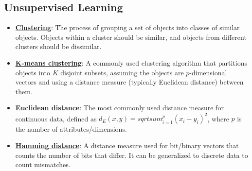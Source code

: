 \documentclass{article}%
\begin{document}
%
\subsection{Unsupervised Learning}%
\label{subsec:UnsupervisedLearning}%
\begin{itemize}[leftmargin=*]%
\item \href{https://purdue.brightspace.com/d2l/common/assets/pdfjs-d2l-dist/1.0.14-legacy/web/viewer.html?file=\%2Fcontent\%2Fenforced\%2F1095467-wl.202510.CS.24300.001\%2F12L2-distance-clusters.pdf\%3Fou\%3D1095467\&lang=en-us\&container=d2l-fileviewer-rendered-pdf\&fullscreen=d2l-fileviewer-rendered-pdf-dialog\&height=667#page=4}{\textbf{Clustering}}: The process of grouping a set of objects into classes of similar objects. Objects within a cluster should be similar, and objects from different clusters should be dissimilar.%
\item \href{https://purdue.brightspace.com/d2l/common/assets/pdfjs-d2l-dist/1.0.14-legacy/web/viewer.html?file=\%2Fcontent\%2Fenforced\%2F1095467-wl.202510.CS.24300.001\%2F12L2-distance-clusters.pdf\%3Fou\%3D1095467\&lang=en-us\&container=d2l-fileviewer-rendered-pdf\&fullscreen=d2l-fileviewer-rendered-pdf-dialog\&height=667#page=21}{\textbf{K-means clustering}}: A commonly used clustering algorithm that partitions objects into $K$ disjoint subsets, assuming the objects are $p$-dimensional vectors and using a distance measure (typically Euclidean distance) between them.%
\item \href{https://purdue.brightspace.com/d2l/common/assets/pdfjs-d2l-dist/1.0.14-legacy/web/viewer.html?file=\%2Fcontent\%2Fenforced\%2F1095467-wl.202510.CS.24300.001\%2F12L2-distance-clusters.pdf\%3Fou\%3D1095467\&lang=en-us\&container=d2l-fileviewer-rendered-pdf\&fullscreen=d2l-fileviewer-rendered-pdf-dialog\&height=667#page=17}{\textbf{Euclidean distance}}: The most commonly used distance measure for continuous data, defined as $d_E(x, y) = sqrt{sum_{i=1}^{p} (x_i - y_i)^2}$, where $p$ is the number of attributes/dimensions.%
\item \href{https://purdue.brightspace.com/d2l/common/assets/pdfjs-d2l-dist/1.0.14-legacy/web/viewer.html?file=\%2Fcontent\%2Fenforced\%2F1095467-wl.202510.CS.24300.001\%2F12L2-distance-clusters.pdf\%3Fou\%3D1095467\&lang=en-us\&container=d2l-fileviewer-rendered-pdf\&fullscreen=d2l-fileviewer-rendered-pdf-dialog\&height=667#page=19}{\textbf{Hamming distance}}: A distance measure used for bit/binary vectors that counts the number of bits that differ. It can be generalized to discrete data to count mismatches.%

\end{itemize}
\end{document}

